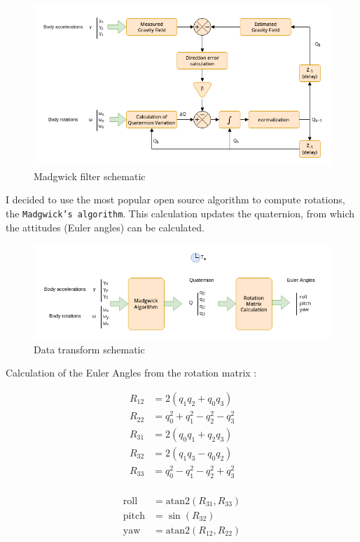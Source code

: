 \begin{figure}[H]
    \centering
    \includegraphics[width=0.9\linewidth]{./projects/pmodnav/madgwick.png}
    \caption{Madgwick filter schematic}
\end{figure}
I decided to use the most popular open source algorithm to compute rotations, the \texttt{Madgwick's algorithm}\cite{Madgwick}. This calculation updates the quaternion, from which the attitudes (Euler angles) can be calculated.
\begin{figure}[H]
    \centering
    \includegraphics[width=0.9\linewidth]{./projects/pmodnav/madgwick_applied.png}
    \caption{Data transform schematic}
\end{figure}

Calculation of the Euler Angles from the rotation matrix :

\begin{minipage}[H]{0.5\textwidth}
    \vspace{0pt}
    \begin{align*}
        R_{12} &= 2(q_1q_2+q_0q_3) \\
        R_{22} &= q_0^2+q_1^2-q_2^2-q_3^2 \\
        R_{31} &= 2(q_0q_1+q_2q_3) \\
        R_{32} &= 2(q_1q_3-q_0q_2) \\
        R_{33} &= q_0^2-q_1^2-q_2^2+q_3^2 \\
    \end{align*}
\end{minipage}%
\begin{minipage}[H]{0.5\textwidth}
    \vspace{0pt}
    \begin{align*}
        \text{roll}  &= \mathrm{atan2}(R_{31},R_{33}) \\
        \text{pitch} &= \sin(R_{32}) \\
        \text{yaw}   &= \mathrm{atan2}(R_{12},R_{22}) \\
    \end{align*}
\end{minipage}


